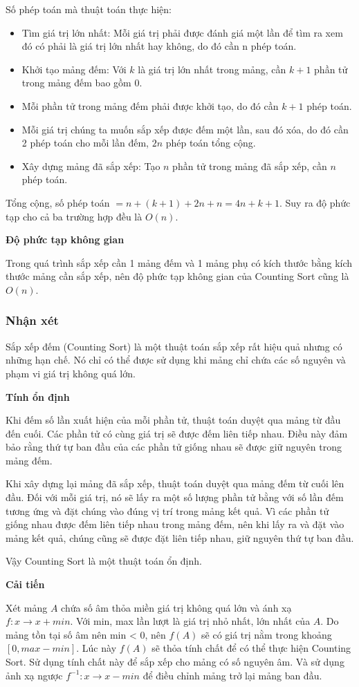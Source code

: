Số phép toán mà thuật toán thực hiện:
\begin{itemize}
    \item Tìm giá trị lớn nhất: Mỗi giá trị phải được đánh giá một lần để tìm ra xem đó có phải là giá trị lớn nhất hay không, do đó cần n phép toán. 
    \item Khởi tạo mảng đếm: Với $k$ là giá trị lớn nhất trong mảng, cần $k + 1$ phần tử trong mảng đếm bao gồm 0. 
    \item Mỗi phần tử trong mảng đếm phải được khởi tạo, do đó cần $k + 1$ phép toán. 
    \item Mỗi giá trị chúng ta muốn sắp xếp được đếm một lần, sau đó xóa, do đó cần 2 phép toán cho mỗi lần đếm, $2n$ phép toán tổng cộng. 
    \item Xây dựng mảng đã sắp xếp: Tạo $n$ phần tử trong mảng đã sắp xếp, cần $n$ phép toán. 

\end{itemize}
Tổng cộng, số phép toán $= n + (k + 1) + 2n + n = 4n + k + 1$. Suy ra độ
phức tạp cho cả ba trường hợp đều là $O(n)$.


\textbf{Độ phức tạp không gian}

Trong quá trình sắp xếp cần 1 mảng đếm và 1 mảng phụ có kích thước bằng kích thước mảng cần sắp xếp, nên độ phức tạp không gian của Counting Sort cũng là $O(n)$.



\subsubsection{Nhận xét}

Sắp xếp đếm (Counting Sort) là một thuật toán sắp xếp rất hiệu quả nhưng có những hạn chế. Nó chỉ có thể được sử dụng khi mảng chỉ chứa các số nguyên và phạm vi giá trị không quá lớn. 


\textbf{Tính ổn định}

Khi đếm số lần xuất hiện của mỗi phần tử, thuật toán duyệt qua mảng từ đầu đến cuối. Các phần tử có cùng giá trị sẽ được đếm liên tiếp nhau. Điều này đảm bảo rằng thứ tự ban đầu của các phần tử giống nhau sẽ được giữ nguyên trong mảng đếm.

Khi xây dựng lại mảng đã sắp xếp, thuật toán duyệt qua mảng đếm từ cuối lên đầu. Đối với mỗi giá trị, nó sẽ lấy ra một số lượng phần tử bằng với số lần đếm tương ứng và đặt chúng vào đúng vị trí trong mảng kết quả. Vì các phần tử giống nhau được đếm liên tiếp nhau trong mảng đếm, nên khi lấy ra và đặt vào mảng kết quả, chúng cũng sẽ được đặt liên tiếp nhau, giữ nguyên thứ tự ban đầu.

Vậy Counting Sort là một thuật toán ổn định.

\textbf{Cải tiến}

Xét mảng $A$ chứa số âm thỏa miền giá trị không quá lớn và ánh xạ $f: x\rightarrow x + min$. Với min, max lần lượt là giá trị nhỏ nhất, lớn nhất của $A$. Do mảng tồn tại số âm nên min < 0, nên $f(A)$ sẽ có giá trị nằm trong khoảng $[0, max - min]$. Lúc này $f(A)$ sẽ thỏa tính chất để có thể thực hiện Counting Sort. Sử dụng tính chất này để sắp xếp cho mảng có số nguyên âm. Và sử dụng ảnh xạ ngược $f^{-1}: x \rightarrow x - min$ để điều chỉnh mảng trở lại mảng ban đầu. 